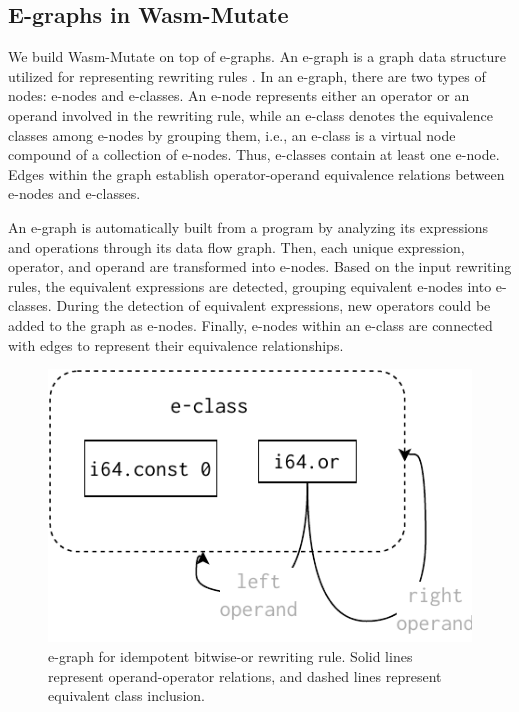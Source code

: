 \documentclass[sigplan,screen]{acmart}
\newcommand*\badge[1]{ \colorbox{red}{\color{white}#1}}
\newcommand{\tool}{{\sc Wasm-Mutate}\xspace}
\newcommand{\todo}[1]{%
\refstepcounter{todo}
\noindent\textbf{\badge{TODO}} {\color{red}#1}
\addcontentsline{td}{todo}
{\color{red}\thesection.\thetodo\xspace #1}}
\begin{document}

\subsection{E-graphs in Wasm-Mutate}
We build \tool on top of e-graphs.
An e-graph is a graph data structure utilized for representing rewriting rules \cite{10.1145/3571207}. 
In an e-graph, there are two types of nodes: e-nodes and e-classes. 
An e-node represents either an operator or an operand involved in the rewriting rule, while an e-class denotes the equivalence classes among e-nodes by grouping them, i.e., an e-class is a virtual node compound of a collection of e-nodes. 
Thus, e-classes contain at least one e-node.
Edges within the graph establish operator-operand equivalence relations between e-nodes and e-classes.

An e-graph is automatically built from a program by analyzing its expressions and operations through its data flow graph.
Then, each unique expression, operator, and operand are transformed into e-nodes.
Based on the input rewriting rules, the equivalent expressions are detected, grouping equivalent e-nodes into e-classes.
During the detection of equivalent expressions, new operators could be added to the graph as e-nodes.
Finally, e-nodes within an e-class are connected with edges to represent their equivalence relationships.

\begin{figure}
    \centering
    \includegraphics[width=0.7\linewidth]{figures/egraph1.pdf}
    \caption{e-graph for idempotent bitwise-or rewriting rule. Solid lines represent operand-operator relations, and dashed lines represent equivalent class inclusion. }
  \label{e-graph}
\end{figure}
\end{document}

